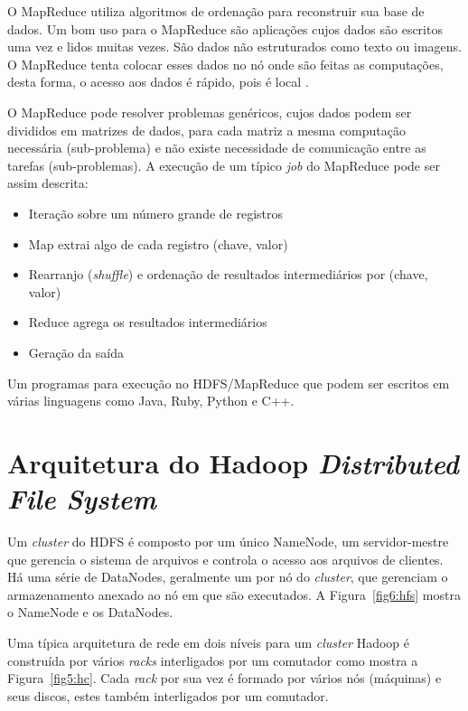 O MapReduce utiliza algoritmos de ordenação para reconstruir sua base de dados.  Um bom uso para o MapReduce são aplicações cujos dados são escritos uma vez e lidos muitas vezes. São dados não estruturados como texto ou imagens. O MapReduce tenta colocar esses dados no nó onde são feitas as computações, desta forma, o acesso aos dados é rápido, pois é local \cite{White:2009}.

O MapReduce pode resolver problemas genéricos, cujos dados podem ser divididos em matrizes de dados, para cada matriz a mesma computação necessária (sub-problema) e não existe necessidade de comunicação entre as tarefas (sub-problemas). A execução de um típico \emph{job} do MapReduce pode ser assim descrita:

\begin{itemize}
    \item Iteração sobre um número grande de registros
    \item Map extrai algo de cada registro (chave, valor)
    \item Rearranjo (\emph{shuffle}) e ordenação de resultados intermediários por (chave, valor)
    \item Reduce agrega os resultados intermediários
    \item Geração da saída
\end{itemize}

Um programas para execução no HDFS/MapReduce que podem ser escritos em várias linguagens como Java, Ruby, Python e C++.


\section{Arquitetura do Hadoop \emph{Distributed File System}}

Um \emph{cluster} do HDFS é composto por um único NameNode, um
servidor-mestre que gerencia o sistema de arquivos e controla o acesso
aos arquivos de clientes. Há uma série de DataNodes, geralmente um por
nó do \emph{cluster}, que gerenciam o armazenamento anexado ao nó em
que são executados. A Figura~\ref{fig6:hfs} mostra o NameNode e os
DataNodes.

Uma típica arquitetura de rede em dois níveis para um \emph{cluster}
Hadoop é construída por vários \emph{racks} interligados por um
comutador como mostra a Figura~\ref{fig5:hc}. Cada \emph{rack} por sua
vez é formado por vários nós (máquinas) e seus discos, estes também
interligados por um comutador.


